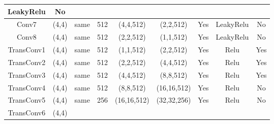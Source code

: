 \documentclass[a4paper,fleqn]{cas-dc}
\begin{document}
\begin{table}[htbp]
\begin{tabular}{|c|c|c|c|c|c|c|c|c|}
  {\color[HTML]{000000} LeakyRelu} &
  {\color[HTML]{000000} No} \\ \hline
{\color[HTML]{000000} Conv7} &
  {\color[HTML]{000000} (4,4)} &
  {\color[HTML]{000000} same} &
  {\color[HTML]{000000} 512} &
  {\color[HTML]{000000} (4,4,512)} &
  {\color[HTML]{000000} (2,2,512)} &
  {\color[HTML]{000000} Yes} &
  {\color[HTML]{000000} LeakyRelu} &
  {\color[HTML]{000000} No} \\ \hline
{\color[HTML]{000000} Conv8} &
  {\color[HTML]{000000} (4,4)} &
  {\color[HTML]{000000} same} &
  {\color[HTML]{000000} 512} &
  {\color[HTML]{000000} (2,2,512)} &
  {\color[HTML]{000000} (1,1,512)} &
  {\color[HTML]{000000} Yes} &
  {\color[HTML]{000000} LeakyRelu} &
  {\color[HTML]{000000} No} \\ \hline
{\color[HTML]{000000} TransConv1} &
  {\color[HTML]{000000} (4,4)} &
  {\color[HTML]{000000} same} &
  {\color[HTML]{000000} 512} &
  {\color[HTML]{000000} (1,1,512)} &
  {\color[HTML]{000000} (2,2,512)} &
  {\color[HTML]{000000} Yes} &
  {\color[HTML]{000000} Relu} &
  {\color[HTML]{000000} Yes} \\ \hline
{\color[HTML]{000000} TransConv2} &
  {\color[HTML]{000000} (4,4)} &
  {\color[HTML]{000000} same} &
  {\color[HTML]{000000} 512} &
  {\color[HTML]{000000} (2,2,512)} &
  {\color[HTML]{000000} (4,4,512)} &
  {\color[HTML]{000000} Yes} &
  {\color[HTML]{000000} Relu} &
  {\color[HTML]{000000} Yes} \\ \hline
{\color[HTML]{000000} TransConv3} &
  {\color[HTML]{000000} (4,4)} &
  {\color[HTML]{000000} same} &
  {\color[HTML]{000000} 512} &
  {\color[HTML]{000000} (4,4,512)} &
  {\color[HTML]{000000} (8,8,512)} &
  {\color[HTML]{000000} Yes} &
  {\color[HTML]{000000} Relu} &
  {\color[HTML]{000000} Yes} \\ \hline
{\color[HTML]{000000} TransConv4} &
  {\color[HTML]{000000} (4,4)} &
  {\color[HTML]{000000} same} &
  {\color[HTML]{000000} 512} &
  {\color[HTML]{000000} (8,8,512)} &
  {\color[HTML]{000000} (16,16,512)} &
  {\color[HTML]{000000} Yes} &
  {\color[HTML]{000000} Relu} &
  {\color[HTML]{000000} No} \\ \hline
{\color[HTML]{000000} TransConv5} &
  {\color[HTML]{000000} (4,4)} &
  {\color[HTML]{000000} same} &
  {\color[HTML]{000000} 256} &
  {\color[HTML]{000000} (16,16,512)} &
  {\color[HTML]{000000} (32,32,256)} &
  {\color[HTML]{000000} Yes} &
  {\color[HTML]{000000} Relu} &
  {\color[HTML]{000000} No} \\ \hline
{\color[HTML]{000000} TransConv6} &
  {\color[HTML]{000000} (4,4)} &

\end{tabular}
\end{table}
\end{document}
